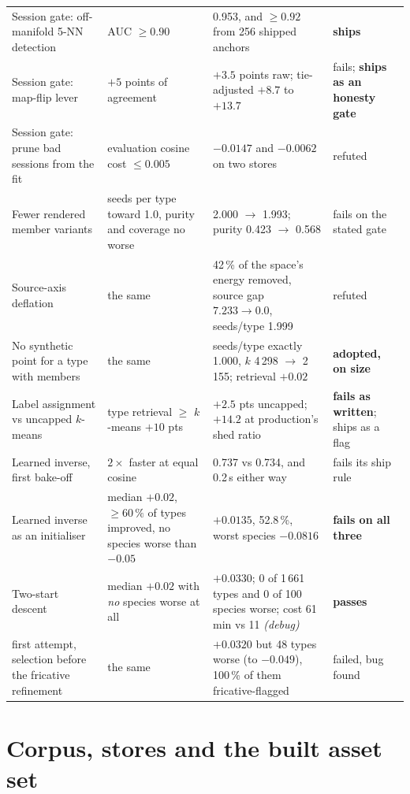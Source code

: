 \documentclass[10pt,twocolumn,a4paper]{article}
\begin{document}
\begin{longtable}{L{3.9cm} L{3.6cm} L{4.6cm} L{2.5cm}}
Session gate: off-manifold 5-NN detection & AUC $\ge 0.90$ & 0.953, and $\ge 0.92$ from 256 shipped anchors & \textbf{ships} \\
Session gate: map-flip lever & $+5$ points of agreement & $+3.5$ points raw; tie-adjusted $+8.7$ to $+13.7$ & fails; \textbf{ships as an honesty gate} \\
Session gate: prune bad sessions from the fit & evaluation cosine cost $\le 0.005$ & $-0.0147$ and $-0.0062$ on two stores & refuted \\
Fewer rendered member variants & seeds per type toward 1.0, purity and coverage no worse & 2.000 $\to$ 1.993; purity 0.423 $\to$ 0.568 & fails on the stated gate \\
Source-axis deflation & the same & 42\,\% of the space's energy removed, source gap $7.233 \to 0.0$, seeds/type 1.999 & refuted \\
No synthetic point for a type with members & the same & seeds/type exactly 1.000, $k$ 4\,298 $\to$ 2\,155; retrieval $+0.02$ & \textbf{adopted, on size} \\
Label assignment vs uncapped $k$-means & type retrieval $\ge$ $k$-means $+10$ pts & $+2.5$ pts uncapped; $+14.2$ at production's shed ratio & \textbf{fails as written}; ships as a flag \\

Learned inverse, first bake-off & $2\times$ faster at equal cosine & 0.737 vs 0.734, and 0.2\,s either way & fails its ship rule \\
Learned inverse as an initialiser & median $+0.02$, $\ge 60\,\%$ of types improved, no species worse than $-0.05$ & $+0.0135$, 52.8\,\%, worst species $-0.0816$ & \textbf{fails on all three} \\
Two-start descent & median $+0.02$ with \emph{no} species worse at all & $+0.0330$; 0 of 1\,661 types and 0 of 100 species worse; cost 61\,min vs 11 \emph{(debug)} & \textbf{passes} \\
\quad first attempt, selection before the fricative refinement & the same & $+0.0320$ but 48 types worse (to $-0.049$), 100\,\% of them fricative-flagged & failed, bug found \\

\end{longtable}
\endgroup

\twocolumn
\section{Corpus, stores and the built asset set}
\label{app:corpus}
\end{document}
